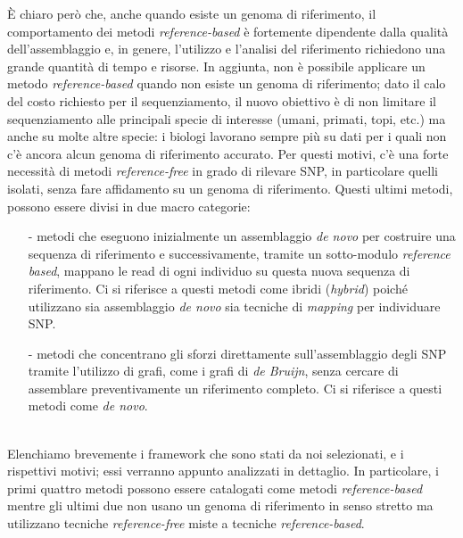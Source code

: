 \documentclass[../main.tex]{subfiles}
\begin{document}
È chiaro però che, anche quando esiste un genoma di riferimento, il comportamento dei metodi \textit{reference-based} è fortemente dipendente dalla qualità dell'assemblaggio e, in genere, l'utilizzo e l'analisi del riferimento richiedono una grande quantità di tempo e risorse. In aggiunta, non è possibile applicare un metodo \textit{reference-based} quando non esiste un genoma di riferimento; dato il calo del costo richiesto per il sequenziamento, il nuovo obiettivo è di non limitare il sequenziamento alle principali specie di interesse (umani, primati, topi, etc.) ma anche su molte altre specie: i biologi lavorano sempre più su dati per i quali non c'è ancora alcun genoma di riferimento accurato. Per questi motivi, c'è una forte necessità di metodi \textit{reference-free} in grado di rilevare SNP, in particolare quelli isolati, senza fare affidamento su un genoma di riferimento. Questi ultimi metodi, possono essere divisi in due macro categorie:
\begin{itemize} 
\item[-] metodi che eseguono inizialmente un assemblaggio \textit{de novo} per costruire una sequenza di riferimento e successivamente, tramite un sotto-modulo \textit{reference based}, mappano le read di ogni individuo su questa nuova sequenza di riferimento. Ci si riferisce a questi metodi come ibridi (\textit{hybrid}) poiché utilizzano sia assemblaggio \textit{de novo} sia tecniche di \textit{mapping} per individuare SNP.
\item[-] metodi che concentrano gli sforzi direttamente sull'assemblaggio degli SNP tramite l'utilizzo di grafi, come i grafi di \textit{de Bruijn}, senza cercare di assemblare preventivamente un riferimento completo. Ci si riferisce a questi metodi come \textit{de novo}.
\end{itemize}

\noindent
\\Elenchiamo brevemente i framework che sono stati da noi selezionati, e i rispettivi motivi; essi verranno appunto analizzati in dettaglio. In particolare, i primi quattro metodi possono essere catalogati come metodi \textit{reference-based} mentre gli ultimi due non usano un genoma di riferimento in senso stretto ma utilizzano tecniche \textit{reference-free} miste a tecniche \textit{reference-based}.
\end{document}
